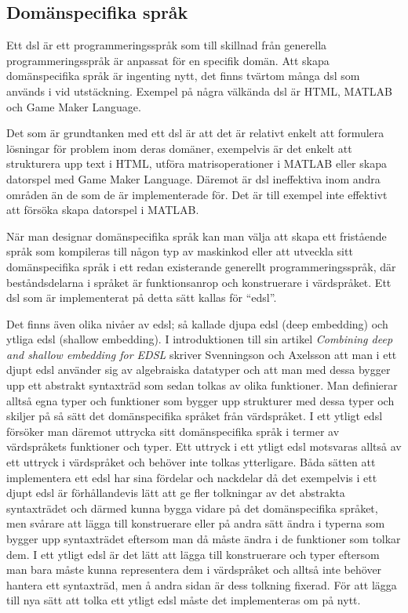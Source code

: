 \documentclass[12pt,a4paper,twoside,openright]{article}
\begin{document}
\subsection{Domänspecifika språk}
Ett \gls{dsl} är ett programmeringsspråk som till skillnad från
generella programmeringsspråk är anpassat för en specifik domän. Att
skapa domän\-specifika språk är ingenting nytt, det finns tvärtom
många \gls{dsl} som används i vid utstäckning. Exempel på några
välkända \gls{dsl} är HTML, MATLAB och Game Maker Language.

Det som är grundtanken med ett \gls{dsl} är att det är relativt enkelt
att formulera lösningar för problem inom deras domäner, exempelvis är
det enkelt att strukturera upp text i HTML, utföra matrisoperationer i
MATLAB eller skapa datorspel med Game Maker Language. Däremot är
\gls{dsl} ineffektiva inom andra områden än de som de är
implementerade för.  Det är till exempel inte effektivt att försöka
skapa datorspel i MATLAB.

När man designar domänspecifika språk kan man välja att skapa ett
fristående språk som kompileras till någon typ av maskinkod eller att
utveckla sitt domänspecifika språk i ett redan existerande generellt
programmeringsspråk, där beståndsdelarna i språket är funktionsanrop
och konstruerare i värdspråket. Ett \gls{dsl} som är implementerat på
detta sätt kallas för ``\gls{edsl}''.

Det finns även olika nivåer av \gls{edsl}; så kallade djupa \gls{edsl}
(deep embedding) och ytliga \gls{edsl} (shallow embedding). I
introduktionen till sin artikel \textit{Combining deep and shallow
  embedding for EDSL} skriver Svenningson och Axelsson
\cite{Svenningsson2012combining} att man i ett djupt \gls{edsl}
använder sig av algebraiska datatyper och att man med dessa bygger upp
ett abstrakt syntaxträd som sedan tolkas av olika funktioner. Man
definierar alltså egna typer och funktioner som bygger upp strukturer
med dessa typer och skiljer på så sätt det domänspecifika språket från
värdspråket. I ett ytligt \gls{edsl} försöker man däremot uttrycka
sitt domänspecifika språk i termer av värdspråkets funktioner och
typer. Ett uttryck i ett ytligt \gls{edsl} motsvaras alltså av ett
uttryck i värdspråket och behöver inte tolkas ytterligare. Båda sätten
att implementera ett \gls{edsl} har sina fördelar och nackdelar då det
exempelvis i ett djupt \gls{edsl} är förhållandevis lätt att ge fler
tolkningar av det abstrakta syntaxträdet och därmed kunna bygga vidare
på det domänspecifika språket, men svårare att lägga till konstruerare
eller på andra sätt ändra i typerna som bygger upp syntaxträdet
eftersom man då måste ändra i de funktioner som tolkar dem. I ett
ytligt \gls{edsl} är det lätt att lägga till konstruerare och typer
eftersom man bara måste kunna representera dem i värdspråket och
alltså inte behöver hantera ett syntaxträd, men å andra sidan är dess
tolkning fixerad. För att lägga till nya sätt att tolka ett ytligt
\gls{edsl} måste det implementeras om på nytt.
\end{document}
